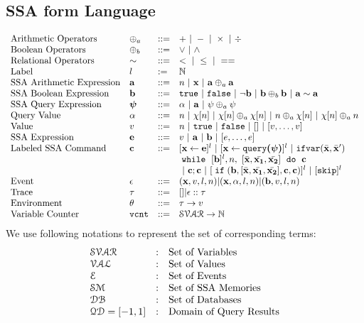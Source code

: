\subsection{SSA form Language}
\[
\begin{array}{llll}
 \mbox{Arithmetic Operators} 
& \oplus_a & ::= & + ~|~ - ~|~ \times 
%
~|~ \div \\  
\mbox{Boolean Operators} 
& \oplus_b & ::= & \lor ~|~ \land
\\
\mbox{Relational Operators} 
& \sim & ::= & < ~|~ \leq ~|~ == 
\\  
%
\mbox{Label} 
& l & := & \mathbb{N} 
\\ 
%
\mbox{SSA Arithmetic Expression} 
& \saexpr & ::= & 
n ~|~ \ssa{x} ~|~ \saexpr \oplus_a \saexpr  
\\
%
\mbox{SSA Boolean Expression} & \sbexpr & ::= & 
	\etrue ~|~ \efalse  ~|~ \neg \sbexpr
	 ~|~ \sbexpr \oplus_b \sbexpr
	~|~ \saexpr \sim \saexpr 
	\\
%
\mbox{SSA Query Expression} 
& \ssa{\qexpr} & ::= 
& { \qval ~|~ \saexpr ~|~ \qexpr \oplus_a \qexpr} 
\\
%
\mbox{Query Value} & \qval & ::= 
& {n ~|~ \chi[n] ~|~ \chi[n] \oplus_a  \chi[n] ~|~ n \oplus_a  \chi[n]
~|~ \chi[n] \oplus_a  n}
\\
%
\mbox{Value} 
& v & ::= & { n \sep \etrue \sep \efalse ~|~ [] ~|~ [v, \dots, v]}  
\\
%
\mbox{SSA Expression} & \sexpr & ::= & v ~|~ \saexpr \sep \sbexpr ~|~ [\expr, \dots, \expr]
\\	
%
\mbox{Labeled SSA Command} 
& \ssa{c} & ::= &   [\assign {\ssa{x}}{ \ssa{\expr}}]^{l} ~|~  [\assign {\ssa{x} } {\ssa{\query(\qexpr)}}]^{l}
%
~|~  {{\eifvar(\bar{\ssa{x}}, \bar{\ssa{x}}')}} 
%
\\ 
&&& 
{\ewhile ~ [ \sbexpr ]^{l} , n,
~ 
[\bar{\ssa{x}}, \bar{\ssa{x_1}}, \bar{\ssa{x_2}}] 
~ \edo ~  \ssa{c} }
\\
&&&
~|~ \ssa{c};\ssa{c}  
~|~ [\eif(\sbexpr, [\bar{\ssa{x}}, \bar{\ssa{x_1}}, \bar{\ssa{x_2}}] , \ssa{c}, \ssa{c})]^l 
~|~ [\eskip]^{l} 
\\
%
\mbox{Event} 
& \event & ::= & (\ssa{x}, v, l, n) | (\ssa{x}, \qval, l, n) | (\sbexpr, v, l, n)
\\
%
\mbox{Trace} & \vtrace
& ::= & [] | \event :: \vtrace
\\
%
\mbox{Environment} 
& \env & ::= & \vtrace \to v
\\
%
\mbox{Variable Counter} & \vcounter
& ::= & \mathcal{SVAR} \to \mathbb{N}
\end{array}
\]
We use following notations to represent the set of corresponding terms:
\[
\begin{array}{lll}
\mathcal{SVAR} & : & \mbox{Set of Variables}  
\\ 
%
\mathcal{VAL} & : & \mbox{Set of Values} 
\\ 
%
%
 \eventset  & : & \mbox{Set of Events}  
\\
%
\mathcal{SM}  & : & \mbox{{Set of SSA Memories}} 
\\
%
\dbdom  & : & \mbox{{Set of Databases}} 
\\
%
\qdom = {[-1,1]} & : & \mbox{{Domain of Query Results}}
\end{array}
\]
%
%
